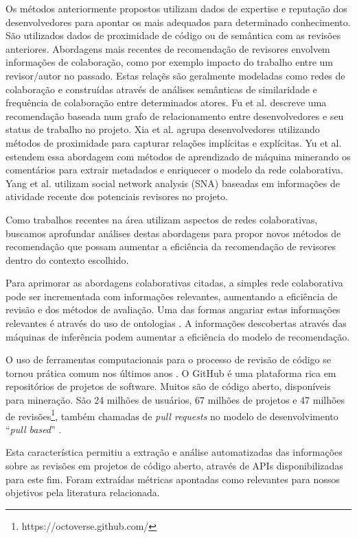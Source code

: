 \documentclass[a4paper,12pt]{monografia}
\theoremstyle{plain}
\theoremstyle{definition}
\theoremstyle{remark}
\begin{document}
Os métodos anteriormente propostos utilizam dados de expertise e reputação dos desenvolvedores para apontar os mais adequados para determinado conhecimento. São utilizados dados de proximidade de código ou de semântica com as revisões anteriores. Abordagens mais recentes de recomendação de revisores envolvem informações de colaboração, como por exemplo impacto do trabalho entre um revisor/autor no passado. Estas relaçẽs são geralmente modeladas como redes de colaboração e construídas através de análises semânticas de similaridade e frequência de colaboração entre determinados atores. Fu et al. \cite{fu2017} descreve uma recomendação baseada num grafo de relacionamento entre desenvolvedores e seu status de trabalho no projeto. Xia et al. \cite{xia2017} agrupa desenvolvedores utilizando métodos de proximidade para capturar relações implícitas e explícitas. Yu et al. \cite{yu2014,yu2014-2} estendem essa abordagem com métodos de aprendizado de máquina minerando os comentários para extrair metadados e enriquecer o modelo da rede colaborativa. Yang et al. \cite{yang2016} utilizam social network analysis (SNA) baseadas em informações de atividade recente dos potenciais revisores no projeto.

Como trabalhos recentes na área utilizam aspectos de redes colaborativas, buscamos aprofundar análises destas abordagens para propor novos métodos de recomendação que possam aumentar a eficiência da recomendação de revisores dentro do contexto escolhido.

Para aprimorar as abordagens colaborativas citadas, a simples rede colaborativa pode ser incrementada com informações relevantes, aumentando a eficiência de revisão e dos métodos de avaliação. Uma das formas angariar estas informações relevantes é através do uso de ontologias \cite{middleton2001,middleton2004}. A informações descobertas através das máquinas de inferência podem aumentar a eficiência do modelo de recomendação.

O uso de ferramentas computacionais para o processo de revisão de código se tornou prática comum nos últimos anos \cite{Bacchelli2013}. O GitHub é uma plataforma rica em repositórios de projetos de software. Muitos são de código aberto, disponíveis para mineração. São 24 milhões de usuários, 67 milhões de projetos e 47 milhões de revisões\footnote{https://octoverse.github.com/}, também chamadas de \textit{pull requests} no modelo de desenvolvimento ``\textit{pull based}'' \cite{gousios2014}.

Esta característica permitiu a extração e análise automatizadas das informações sobre as revisões em projetos de código aberto, através de APIs disponibilizadas para este fim. Foram extraídas métricas apontadas como relevantes para nossos objetivos pela literatura relacionada.
\end{document}
